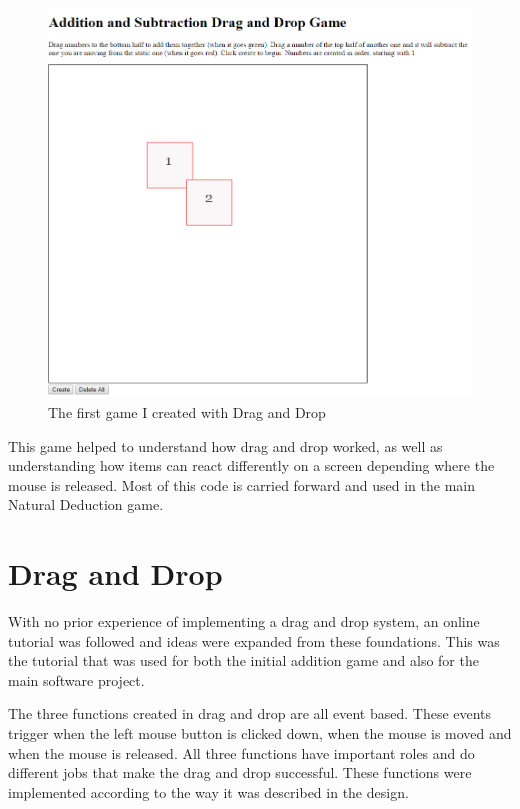 \begin{figure}[H]
\centering
\includegraphics[scale=0.4]{addition1}
\caption{The first game I created with Drag and Drop}
  \label{fig:addition1}
\end{figure}

This game helped to understand how drag and drop worked, as well as understanding how items can react differently on a screen depending where the mouse is released. Most of this code is carried forward and used in the main Natural Deduction game.

\section{Drag and Drop}

With no prior experience of implementing a drag and drop system, an online tutorial was followed and ideas were expanded from these foundations. \cite{Howt28:online} This was the tutorial that was used for both the initial addition game and also for the main software project.

The three functions created in drag and drop are all event based. These events trigger when the left mouse button is clicked down, when the mouse is moved and when the mouse is released. All three functions have important roles and do different jobs that make the drag and drop successful. These functions were implemented according to the way it was described in the design.

